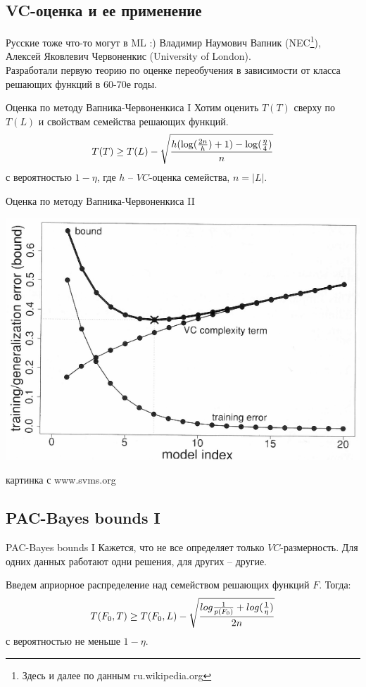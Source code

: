 \documentclass[14pt, fleqn, xcolor={dvipsnames, table}]{beamer}
\begin{document}
\subsection{VC-оценка и ее применение}
\begin{frame}{Русские тоже что-то могут в ML :)}
Владимир Наумович Вапник (NEC\footnote{Здесь и далее по данным ru.wikipedia.org}), \\
Алексей Яковлевич Червоненкис (University of London). \\
Разработали первую теорию по оценке переобучения в зависимости от класса решающих функций в 60-70е годы.
\end{frame}

\begin{frame}{Оценка по методу Вапника-Червоненкиса I}
Хотим оценить $T(T)$ сверху по $T(L)$ и свойствам семейства решающих функций.\\
$$
T(T) \ge T(L) - \sqrt{h(\log(\frac{2n}{h})+1)-\log(\frac{\eta}{4})\over n}
$$
с вероятностью $1-\eta$, где $h$ -- $VC$-оценка семейства, $n = |L|$.
\end{frame}

\begin{frame}{Оценка по методу Вапника-Червоненкиса II}
\begin{center}
\includegraphics[height=0.6\textheight]{Herbrich2002_4-4.png}
\end{center}
{\footnotesize картинка с www.svms.org}
\end{frame}

\subsection{PAC-Bayes bounds I}
\begin{frame}{PAC-Bayes bounds I}
\small
Кажется, что не все определяет только $VC$-размерность. Для одних данных работают одни решения, для других -- другие. \\
\begin{definition}
Введем априорное распределение над семейством решающих функций $F$. Тогда:
$$
T(F_0, T) \ge T(F_0, L) - \sqrt{log \frac{1}{p(F_0)} + log(\frac{1}{\eta}) \over 2n}
$$
с вероятностью не меньше $1-\eta$.
\end{definition}
\end{frame}
\end{document}
